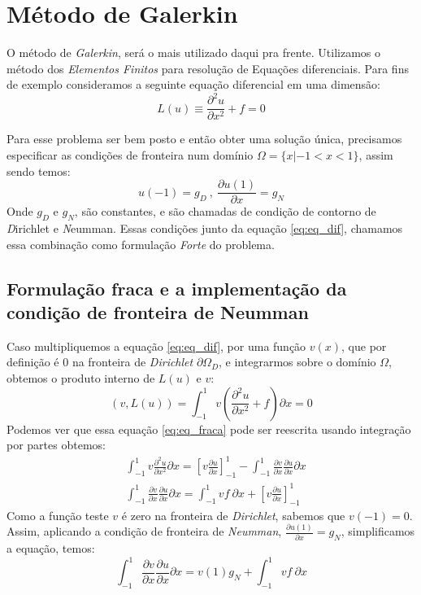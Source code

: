 \section{Método de Galerkin}
 O método de \emph{Galerkin}, será o mais utilizado daqui pra frente. Utilizamos o método dos \emph{Elementos Finitos} para resolução de Equações diferenciais. Para fins de exemplo consideramos a seguinte equação diferencial em uma dimensão:
 \begin{equation}\label{eq:eq_dif}
 L(u) \equiv \frac{\partial^2 u}{\partial x^2} + f = 0
 \end{equation}
 
 Para esse problema ser bem posto e então obter uma solução única, precisamos especificar as condições de fronteira num domínio $\Omega = \{x| -1 < x < 1\}$, assim sendo temos:
 \begin{equation}
 u(-1)=g_D\ ,\ \frac{\partial u(1)}{\partial x} = g_N
 \end{equation}
 Onde $g_D$ e $g_N$, são constantes, e são chamadas de condição de contorno de \emph{D}irichlet e \emph{N}eumman. Essas condições junto da equação \eqref{eq:eq_dif}, chamamos essa combinação como formulação \emph{Forte} do problema.
\subsection{Formulação fraca e a implementação da condição de fronteira de Neumman}
 Caso multipliquemos a equação \eqref{eq:eq_dif}, por uma função $v(x)$, que por definição é 0 na fronteira de \emph{Dirichlet} $\partial \Omega_D$, e integrarmos sobre o domínio $\Omega$, obtemos o produto interno de $L(u)$ e $v$:
 \begin{equation}\label{eq:eq_fraca}
 (v,L(u))=\int^1_{-1} v\left ( \frac{\partial^2u}{\partial x^2} + f \right )\partial x = 0
 \end{equation}
 Podemos ver que essa equação \eqref{eq:eq_fraca} pode ser reescrita usando integração por partes obtemos:
 \begin{align}
& \int^{1}_{-1} v \frac{\partial^2 u}{\partial x^2} \partial x = \left [ v\frac{\partial u}{\partial x}    \right ]^{1}_{-1} - \int^{1}_{-1} \frac{\partial v}{\partial x}  \frac{\partial u}{\partial x}  \partial x \\
&  \int^{1}_{-1} \frac{\partial v}{\partial x}  \frac{\partial u}{\partial x}  \partial x =  \int^{1}_{-1}  v f\ \partial x  + \left [ v\frac{\partial u}{\partial x}    \right ]^{1}_{-1} 
 \end{align}
 Como a função teste $v$ é zero na fronteira de \emph{Dirichlet}, sabemos que $v(-1) = 0$. Assim, aplicando a condição de fronteira de \emph{Neumman}, $\frac{\partial u(1)}{\partial x} = g_N$, simplificamos a equação, temos:
 \begin{equation}
 \int^{1}_{-1} \frac{\partial v}{\partial x}  \frac{\partial u}{\partial x}  \partial x =  v(1)g_N + \int^{1}_{-1}  v f\ \partial x  
\end{equation}

